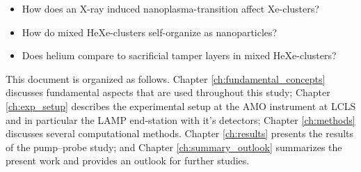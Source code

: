 \begin{itemize}
	\item How does an X-ray induced nanoplasma-transition affect Xe-clusters?
	\item How do mixed HeXe-clusters self-organize as nanoparticles?
	\item Does helium compare to sacrificial tamper layers in mixed HeXe-clusters?
\end{itemize}
%
This document is organized as follows. Chapter \ref{ch:fundamental_concepts} discusses fundamental aspects that are used throughout this study; Chapter \ref{ch:exp_setup} describes the experimental setup at the AMO instrument at LCLS and in particular the LAMP end-station with it's detectors; Chapter \ref{ch:methods} discusses several computational methods. Chapter \ref{ch:results} presents the results of the pump--probe study; and Chapter \ref{ch:summary_outlook} summarizes the present work and provides an outlook for further studies.
%
%
%